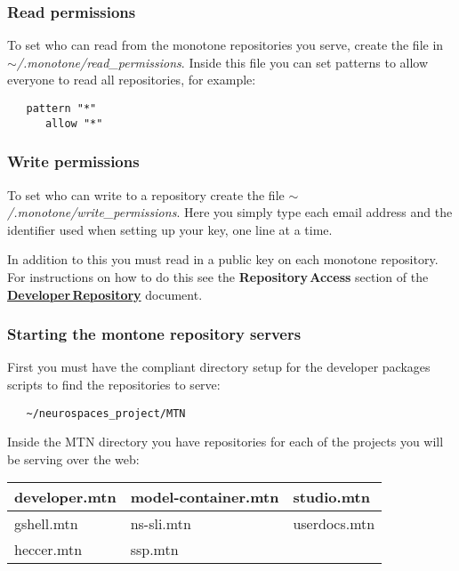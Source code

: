 \documentclass[12pt]{article}
\begin{document}
\subsubsection*{Read permissions}

To set who can read from the monotone repositories you serve, create the file in {\it $\sim$/.monotone/read\_permissions}. Inside this file you can set patterns to allow everyone to read all repositories, for example:
\begin{verbatim}
   pattern "*"
      allow "*"
\end{verbatim}

\subsubsection*{Write permissions}

To set who can write to a repository create the file {\it $\sim$/.monotone/write\_permissions}. Here you simply type each email address and the identifier used when setting up your key, one line at a time.

In addition to this you must read in a public key on each monotone repository. For instructions on how to do this see the {\bf Repository\,Access} section of the \href{../developer-repository/developer-repository.tex}{\bf Developer\,Repository} document.

\subsubsection*{Starting the montone repository servers}

First you must have the compliant directory setup for the developer packages scripts to find the repositories to serve:
\begin{verbatim}
   ~/neurospaces_project/MTN
\end{verbatim}
Inside the MTN directory you have repositories for each of the projects you will be serving over the web:

\vspace*{3mm}
\begin{tabular}{| l | l |  l |}
\hline
developer.mtn & model-container.mtn & studio.mtn      \\ \hline
gshell.mtn        & ns-sli.mtn                     & userdocs.mtn \\ \hline
heccer.mtn       & ssp.mtn                        &                          \\ \hline
\end{tabular}
\vspace*{3mm}
\end{document}
